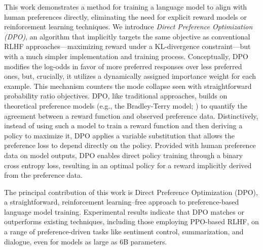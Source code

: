 This work demonstrates a method for training a language model to align with human preferences directly, eliminating the need for explicit reward models or reinforcement learning techniques. We introduce \textit{{Direct Preference Optimization} (DPO)}, an algorithm that implicitly targets the same objective as conventional RLHF approaches—maximizing reward under a KL-divergence constraint—but with a much simpler implementation and training process. Conceptually, DPO modifies the log-odds in favor of more preferred responses over less preferred ones, but, crucially, it utilizes a dynamically assigned importance weight for each example. This mechanism counters the mode collapse seen with straightforward probability ratio objectives. DPO, like traditional approaches, builds on theoretical preference models (e.g., the Bradley-Terry model; \cite{bradley1952rankanalysis}) to quantify the agreement between a reward function and observed preference data. Distinctively, instead of using such a model to train a reward function and then deriving a policy to maximize it, DPO applies a variable substitution that allows the preference loss to depend directly on the policy. Provided with human preference data on model outputs, DPO enables direct policy training through a binary cross entropy loss, resulting in an optimal policy for a reward implicitly derived from the preference data.

The principal contribution of this work is Direct Preference Optimization (DPO), a straightforward, reinforcement learning–free approach to preference-based language model training. Experimental results indicate that DPO matches or outperforms existing techniques, including those employing PPO-based RLHF, on a range of preference-driven tasks like sentiment control, summarization, and dialogue, even for models as large as 6B parameters.

